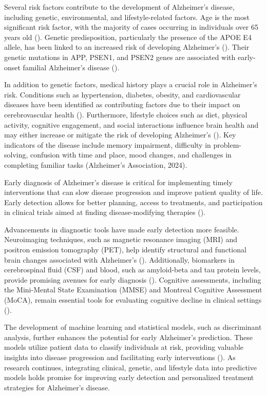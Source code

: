 \documentclass[12pt]{article}
\begin{document}
Several risk factors contribute to the development of Alzheimer’s disease, including genetic, environmental, and lifestyle-related factors. Age is the most significant risk factor, with the majority of cases occurring in individuals over 65 years old (\cite{Livingston2020}). Genetic predisposition, 
particularly the presence of the APOE E4 allele, has been linked to an increased risk of developing Alzheimer’s (\Cite{dibattista2016}). Their genetic mutations in APP, PSEN1, and PSEN2 genes are associated with early-onset familial Alzheimer’s disease (\cite{lanoiselee2017}). 

In addition to genetic factors, medical history plays a crucial role in Alzheimer’s risk. Conditions such as hypertension, diabetes, obesity, and cardiovascular diseases have been identified as contributing factors due to their impact on cerebrovascular health (\cite{Silva2019}). 
Furthermore, lifestyle choices such as diet, physical activity, cognitive engagement, and social interactions influence brain health and may either increase or mitigate the risk of developing Alzheimer’s (\cite{Lourida2019}). Key indicators of the disease include memory impairment, difficulty in problem-solving, confusion with time and place, mood changes, and challenges in completing familiar tasks (Alzheimer’s Association, 2024).

Early diagnosis of Alzheimer’s disease is critical for implementing timely interventions that can slow disease progression and improve patient quality of life. Early detection allows for better planning, access to treatments, and participation in clinical trials aimed at finding disease-modifying therapies (\cite{Cummings2019}). 

Advancements in diagnostic tools have made early detection more feasible. Neuroimaging techniques, such as magnetic resonance imaging (MRI) and positron emission tomography (PET), help identify structural and functional brain changes associated with Alzheimer’s (\cite{Jack2018}). Additionally, biomarkers in cerebrospinal fluid (CSF) and blood, such as amyloid-beta and tau protein levels, provide promising avenues for early diagnosis (\cite{Hansson2019}).
Cognitive assessments, including the Mini-Mental State Examination (MMSE) and Montreal Cognitive Assessment (MoCA), remain essential tools for evaluating cognitive decline in clinical settings (\cite{Jia2021}). 

The development of machine learning and statistical models, such as discriminant analysis, further enhances the potential for early Alzheimer’s prediction. These models utilize patient data to classify individuals at risk, providing valuable insights into disease progression and facilitating early interventions (\cite{Arslan2022}). 
As research continues, integrating clinical, genetic, and lifestyle data into predictive models holds promise for improving early detection and personalized treatment strategies for Alzheimer’s disease.
\end{document}
